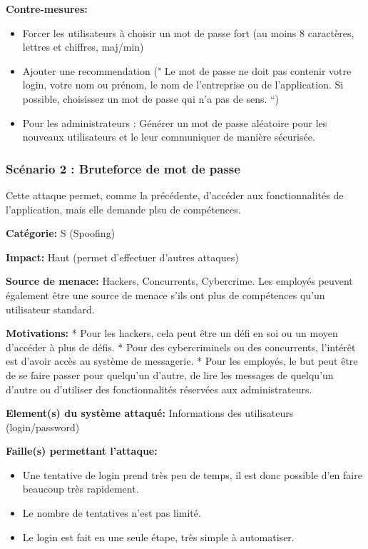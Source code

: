 \documentclass{article}
\begin{document}
\textbf{Contre-mesures:}

\begin{itemize}
\tightlist
\item
  Forcer les utilisateurs à choisir un mot de passe fort (au moins 8
  caractères, lettres et chiffres, maj/min)
\item
  Ajouter une recommendation (" Le mot de passe ne doit pas contenir
  votre login, votre nom ou prénom, le nom de l'entreprise ou de
  l'application. Si possible, choisissez un mot de passe qui n'a pas de
  sens. ``)
\item
  Pour les administrateurs : Générer un mot de passe aléatoire pour les
  nouveaux utilisateurs et le leur communiquer de manière sécurisée.
\end{itemize}

\hypertarget{scuxe9nario-2-bruteforce-de-mot-de-passe}{%
\subsubsection{Scénario 2 : Bruteforce de mot de
passe}\label{scuxe9nario-2-bruteforce-de-mot-de-passe}}

Cette attaque permet, comme la précédente, d'accéder aux fonctionnalités
de l'application, mais elle demande plsu de compétences.

\textbf{Catégorie:} S (Spoofing)

\textbf{Impact:} Haut (permet d'effectuer d'autres attaques)

\textbf{Source de menace:} Hackers, Concurrents, Cybercrime. Les
employés peuvent également être une source de menace s'ils ont plus de
compétences qu'un utilisateur standard.

\textbf{Motivations:} * Pour les hackers, cela peut être un défi en soi
ou un moyen d'accéder à plus de défis. * Pour des cybercriminels ou des
concurrents, l'intérêt est d'avoir accès au système de messagerie. *
Pour les employés, le but peut être de se faire passer pour quelqu'un
d'autre, de lire les messages de quelqu'un d'autre ou d'utiliser des
fonctionnalités réservées aux administrateurs.

\textbf{Element(s) du système attaqué:} Informations des utilisateurs
(login/password)

\textbf{Faille(s) permettant l'attaque:}

\begin{itemize}
\tightlist
\item
  Une tentative de login prend très peu de temps, il est donc possible
  d'en faire beaucoup très rapidement.
\item
  Le nombre de tentatives n'est pas limité.
\item
  Le login est fait en une seule étape, très simple à automatiser.
\end{itemize}
\end{document}
